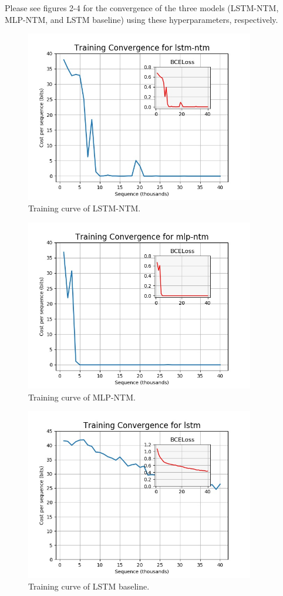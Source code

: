 \documentclass{amsart}
\numberwithin{equation}{section}
\theoremstyle{definition}
\theoremstyle{remark}
\begin{document}
Please see figures 2-4 for the convergence of the three models (LSTM-NTM,
MLP-NTM, and LSTM baseline) using these hyperparameters, respectively. \\

\begin{figure}[h]
\includegraphics[width=100mm]{outputs/lstm-ntm_convergence}
\caption{Training curve of LSTM-NTM.}
\label{Figure 2}
\end{figure}

\begin{figure}[h]
\includegraphics[width=100mm]{outputs/mlp-ntm_convergence}
\caption{Training curve of MLP-NTM.}
\label{Figure 3}
\end{figure}

\begin{figure}[h]
\includegraphics[width=100mm]{outputs/lstm_convergence}
\caption{Training curve of LSTM baseline.}
\label{Figure 4}
\end{figure}
\end{document}
